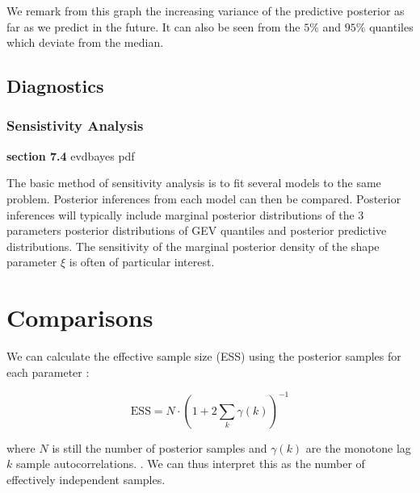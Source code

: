   
  We remark from this graph the increasing variance of the predictive posterior as far as we predict in the future. It can also be seen from the $5\%$ and $95\%$ quantiles which deviate from the median. 
  


\subsection{Diagnostics}

\subsubsection*{Sensistivity Analysis}

\textbf{section 7.4} evdbayes pdf 


The basic method of sensitivity analysis is to fit several models to the same problem.
 Posterior inferences from each model can then be compared. Posterior inferences
will typically include marginal posterior distributions of the 3 parameters posterior distributions of GEV quantiles and posterior predictive distributions.
The sensitivity of the marginal posterior density of the shape parameter $\xi$ is often of particular interest.



\section{Comparisons}

\citet{hartmann_bayesian_2016}
We can calculate the effective sample size (ESS) using the posterior samples for each parameter : 

\begin{equation}
\text{ESS}=N\cdot (1+2\sum_k\gamma(k))^{-1}
\end{equation}

where $N$ is still the number of posterior samples and $\gamma(k)$ are the monotone lag $k$ sample autocorrelations. \citet{geyer__1992}. We can thus interpret this as the number of effectively independent samples. 


